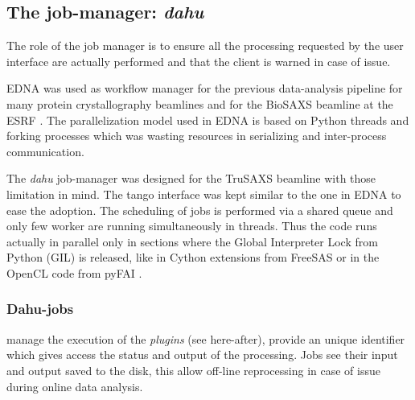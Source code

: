 \documentclass[preprint]{iucr}              %
\begin{document}
\subsection{The job-manager: \textit{dahu}}

The role of the job manager is to ensure all the processing requested by the user interface are actually performed and that the client is warned in case of issue.

EDNA was used as workflow manager for the previous data-analysis pipeline for many protein crystallography beamlines \cite{edna} and for the BioSAXS beamline at the ESRF \cite{BM29ODA}.
The parallelization model used in EDNA is based on Python threads and forking processes which was wasting resources in serializing and inter-process communication. 
 
The \textit{dahu} job-manager was designed for the TruSAXS beamline \cite{id02_2022} with those limitation in mind. 
The tango interface \cite{tango} was kept similar to the one in EDNA to ease the adoption.
The scheduling of jobs is performed via a shared queue and only few worker are running simultaneously in threads.
Thus the code runs actually in parallel only in sections where the Global Interpreter Lock from Python (GIL) is released, like in Cython extensions from FreeSAS or in the OpenCL code from pyFAI \cite{pyFAI_gpu}.

\subsubsection{Dahu-jobs}
manage the execution of the \textit{plugins} (see here-after), provide an unique identifier which gives access the status and output of the processing.
Jobs see their input and output saved to the disk, this allow off-line reprocessing in case of issue during online data analysis.
\end{document}
